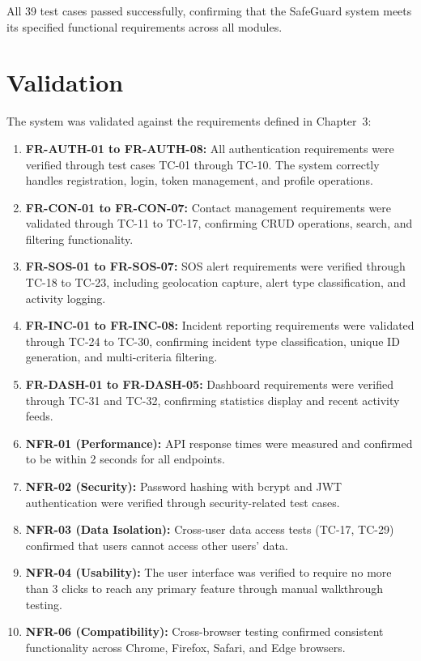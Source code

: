 All 39 test cases passed successfully, confirming that the SafeGuard system meets its specified functional requirements across all modules.

\section{Validation}

The system was validated against the requirements defined in Chapter~3:

\begin{enumerate}[label=\textbf{V\arabic*.}]
  \item \textbf{FR-AUTH-01 to FR-AUTH-08:} All authentication requirements were verified through test cases TC-01 through TC-10. The system correctly handles registration, login, token management, and profile operations.

  \item \textbf{FR-CON-01 to FR-CON-07:} Contact management requirements were validated through TC-11 to TC-17, confirming CRUD operations, search, and filtering functionality.

  \item \textbf{FR-SOS-01 to FR-SOS-07:} SOS alert requirements were verified through TC-18 to TC-23, including geolocation capture, alert type classification, and activity logging.

  \item \textbf{FR-INC-01 to FR-INC-08:} Incident reporting requirements were validated through TC-24 to TC-30, confirming incident type classification, unique ID generation, and multi-criteria filtering.

  \item \textbf{FR-DASH-01 to FR-DASH-05:} Dashboard requirements were verified through TC-31 and TC-32, confirming statistics display and recent activity feeds.

  \item \textbf{NFR-01 (Performance):} API response times were measured and confirmed to be within 2 seconds for all endpoints.

  \item \textbf{NFR-02 (Security):} Password hashing with bcrypt and JWT authentication were verified through security-related test cases.

  \item \textbf{NFR-03 (Data Isolation):} Cross-user data access tests (TC-17, TC-29) confirmed that users cannot access other users' data.

  \item \textbf{NFR-04 (Usability):} The user interface was verified to require no more than 3 clicks to reach any primary feature through manual walkthrough testing.

  \item \textbf{NFR-06 (Compatibility):} Cross-browser testing confirmed consistent functionality across Chrome, Firefox, Safari, and Edge browsers.
\end{enumerate}
